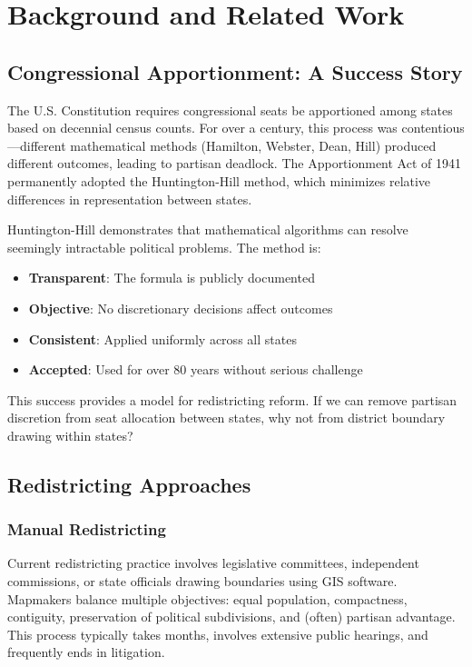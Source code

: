\section{Background and Related Work}

\subsection{Congressional Apportionment: A Success Story}

The U.S. Constitution requires congressional seats be apportioned among states based on decennial census counts. For over a century, this process was contentious—different mathematical methods (Hamilton, Webster, Dean, Hill) produced different outcomes, leading to partisan deadlock. The Apportionment Act of 1941 permanently adopted the Huntington-Hill method, which minimizes relative differences in representation between states.

Huntington-Hill demonstrates that mathematical algorithms can resolve seemingly intractable political problems. The method is:
\begin{itemize}
\item \textbf{Transparent}: The formula is publicly documented
\item \textbf{Objective}: No discretionary decisions affect outcomes
\item \textbf{Consistent}: Applied uniformly across all states
\item \textbf{Accepted}: Used for over 80 years without serious challenge
\end{itemize}

This success provides a model for redistricting reform. If we can remove partisan discretion from seat allocation between states, why not from district boundary drawing within states?

\subsection{Redistricting Approaches}

\subsubsection{Manual Redistricting}

Current redistricting practice involves legislative committees, independent commissions, or state officials drawing boundaries using GIS software. Mapmakers balance multiple objectives: equal population, compactness, contiguity, preservation of political subdivisions, and (often) partisan advantage. This process typically takes months, involves extensive public hearings, and frequently ends in litigation.

